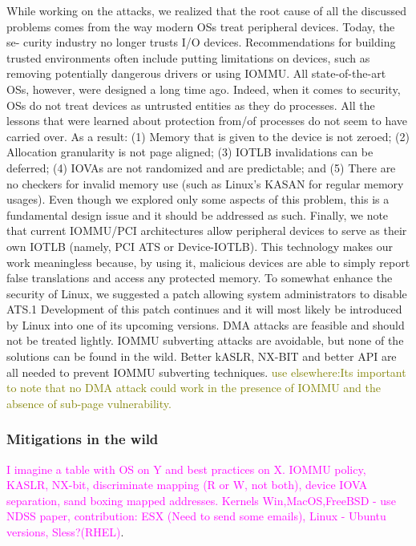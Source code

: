 While working on the attacks, we realized that the root cause of all the discussed problems comes from the way modern OSs treat peripheral devices. Today, the se- curity industry no longer trusts I/O devices. Recommendations for building trusted environments often include putting limitations on devices, such as removing potentially dangerous drivers or using IOMMU. All state-of-the-art OSs, however, were designed a long time ago. Indeed, when it comes to security, OSs do not treat devices as untrusted entities as they do processes. All the lessons that were learned about protection from/of processes do not seem to have carried over. As a result: (1) Memory that is given to the device is not zeroed; (2) Allocation granularity is not page aligned; (3) IOTLB invalidations can be deferred; (4) IOVAs are not randomized and are predictable; and (5) There are no checkers for invalid memory use (such as Linux’s KASAN for regular memory usages). Even though we explored only some aspects of this problem, this is a fundamental design issue and it should be addressed as such. Finally, we note that current IOMMU/PCI architectures allow peripheral devices to serve as their own IOTLB (namely, PCI ATS or Device-IOTLB). This technology makes our work meaningless because, by using it, malicious devices are able to simply report false translations and access any protected memory. To somewhat enhance the security of Linux, we suggested a patch allowing system administrators to disable ATS.1 Development of this patch continues and it will most likely be introduced by Linux into one of its upcoming versions.\newline
DMA attacks are feasible and should not be treated lightly. IOMMU subverting attacks are avoidable, but none of the solutions can be found in the wild. Better kASLR, NX-BIT and better API are all needed to prevent IOMMU subverting techniques. 
\textcolor{olive}{use elsewhere:Its important to note that no DMA attack could work in the presence of IOMMU and the absence of sub-page vulnerability.}

\subsubsection{Mitigations in the wild}
\textcolor{magenta}{I imagine a table with OS on Y and best practices on X.
IOMMU policy, KASLR, NX-bit, discriminate mapping (R or W, not both), device IOVA separation, sand boxing mapped addresses.
Kernels Win,MacOS,FreeBSD - use NDSS paper, contribution: ESX (Need to send some emails), Linux - Ubuntu versions, Sless?(RHEL)}.